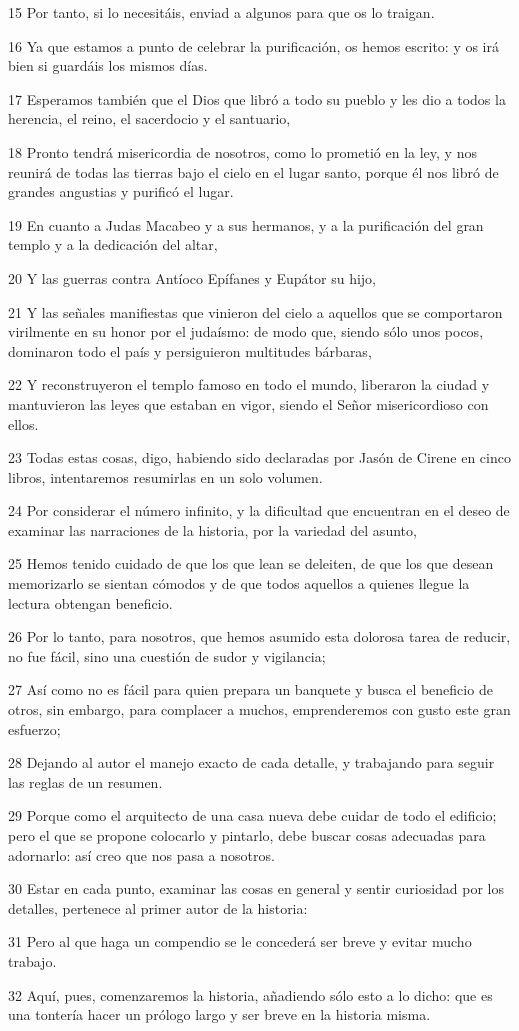 \par 15 Por tanto, si lo necesitáis, enviad a algunos para que os lo traigan.
\par 16 Ya que estamos a punto de celebrar la purificación, os hemos escrito: y os irá bien si guardáis los mismos días.
\par 17 Esperamos también que el Dios que libró a todo su pueblo y les dio a todos la herencia, el reino, el sacerdocio y el santuario,
\par 18 Pronto tendrá misericordia de nosotros, como lo prometió en la ley, y nos reunirá de todas las tierras bajo el cielo en el lugar santo, porque él nos libró de grandes angustias y purificó el lugar.
\par 19 En cuanto a Judas Macabeo y a sus hermanos, y a la purificación del gran templo y a la dedicación del altar,
\par 20 Y las guerras contra Antíoco Epífanes y Eupátor su hijo,
\par 21 Y las señales manifiestas que vinieron del cielo a aquellos que se comportaron virilmente en su honor por el judaísmo: de modo que, siendo sólo unos pocos, dominaron todo el país y persiguieron multitudes bárbaras,
\par 22 Y reconstruyeron el templo famoso en todo el mundo, liberaron la ciudad y mantuvieron las leyes que estaban en vigor, siendo el Señor misericordioso con ellos.
\par 23 Todas estas cosas, digo, habiendo sido declaradas por Jasón de Cirene en cinco libros, intentaremos resumirlas en un solo volumen.
\par 24 Por considerar el número infinito, y la dificultad que encuentran en el deseo de examinar las narraciones de la historia, por la variedad del asunto,
\par 25 Hemos tenido cuidado de que los que lean se deleiten, de que los que desean memorizarlo se sientan cómodos y de que todos aquellos a quienes llegue la lectura obtengan beneficio.
\par 26 Por lo tanto, para nosotros, que hemos asumido esta dolorosa tarea de reducir, no fue fácil, sino una cuestión de sudor y vigilancia;
\par 27 Así como no es fácil para quien prepara un banquete y busca el beneficio de otros, sin embargo, para complacer a muchos, emprenderemos con gusto este gran esfuerzo;
\par 28 Dejando al autor el manejo exacto de cada detalle, y trabajando para seguir las reglas de un resumen.
\par 29 Porque como el arquitecto de una casa nueva debe cuidar de todo el edificio; pero el que se propone colocarlo y pintarlo, debe buscar cosas adecuadas para adornarlo: así creo que nos pasa a nosotros.
\par 30 Estar en cada punto, examinar las cosas en general y sentir curiosidad por los detalles, pertenece al primer autor de la historia:
\par 31 Pero al que haga un compendio se le concederá ser breve y evitar mucho trabajo.
\par 32 Aquí, pues, comenzaremos la historia, añadiendo sólo esto a lo dicho: que es una tontería hacer un prólogo largo y ser breve en la historia misma.

